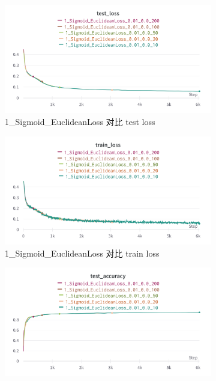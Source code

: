 \documentclass{article}
\begin{document}
\begin{figure}[htbp]
	\centering
	\begin{subfigure}{0.475\textwidth}
		\centering
		\includegraphics[width=1\textwidth]{../pics/批量_1_Sigmoid_EuclideanLoss_test_loss.png}
		\caption{1\_Sigmoid\_EuclideanLoss 对比 test loss}
	\end{subfigure}
	\begin{subfigure}{0.475\textwidth}
		\centering
		\includegraphics[width=1\textwidth]{../pics/批量_1_Sigmoid_EuclideanLoss_train_loss.png}
		\caption{1\_Sigmoid\_EuclideanLoss 对比 train loss}
	\end{subfigure}
	\begin{subfigure}{0.475\textwidth}
		\centering
		\includegraphics[width=1\textwidth]{../pics/批量_1_Sigmoid_EuclideanLoss_test_acc.png}

\end{subfigure}
\end{figure}
\end{document}

